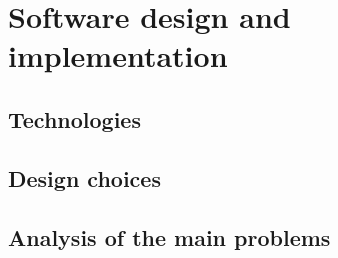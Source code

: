 \section{Software design and implementation}
    \subsection{Technologies}
    \subsection{Design choices}
    \subsection{Analysis of the main problems}